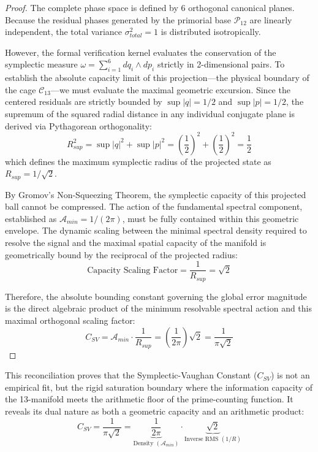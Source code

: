 \documentclass[sn-mathphys-num, pdflatex]{sn-jnl}
\begin{document}
\begin{proof}
The complete phase space is defined by 6 orthogonal canonical planes. Because the residual phases generated by the primorial base $\mathcal{P}_{12}$ are linearly independent, the total variance $\sigma_{total}^2 = 1$ is distributed isotropically. 

However, the formal verification kernel evaluates the conservation of the symplectic measure $\omega = \sum_{i=1}^{6} dq_i \wedge dp_i$ strictly in 2-dimensional pairs. To establish the absolute capacity limit of this projection—the physical boundary of the cage $\mathcal{C}_{13}$—we must evaluate the maximal geometric excursion. Since the centered residuals are strictly bounded by $\sup|q| = 1/2$ and $\sup|p| = 1/2$, the supremum of the squared radial distance in any individual conjugate plane is derived via Pythagorean orthogonality:
$$ R_{sup}^2 = \sup|q|^2 + \sup|p|^2 = \left(\frac{1}{2}\right)^2 + \left(\frac{1}{2}\right)^2 = \frac{1}{2} $$
which defines the maximum symplectic radius of the projected state as $R_{sup} = 1/\sqrt{2}$.

By Gromov's Non-Squeezing Theorem, the symplectic capacity of this projected ball cannot be compressed. The action of the fundamental spectral component, established as $\mathcal{A}_{min} = 1/(2\pi)$, must be fully contained within this geometric envelope. The dynamic scaling between the minimal spectral density required to resolve the signal and the maximal spatial capacity of the manifold is geometrically bound by the reciprocal of the projected radius:
$$ \text{Capacity Scaling Factor} = \frac{1}{R_{sup}} = \sqrt{2} $$

Therefore, the absolute bounding constant governing the global error magnitude is the direct algebraic product of the minimum resolvable spectral action and this maximal orthogonal scaling factor:
$$ C_{SV} = \mathcal{A}_{min} \cdot \frac{1}{R_{sup}} = \left(\frac{1}{2\pi}\right) \sqrt{2} = \frac{1}{\pi\sqrt{2}} $$
\end{proof}

This reconciliation proves that the Symplectic-Vaughan Constant ($C_{SV}$) is not an empirical fit, but the rigid saturation boundary where the information capacity of the 13-manifold meets the arithmetic floor of the prime-counting function. It reveals its dual nature as both a geometric capacity and an arithmetic product:
\begin{equation}
C_{SV} = \frac{1}{\pi\sqrt{2}} = \underbrace{\frac{1}{2\pi}}_{\text{Density } (\mathcal{A}_{min})} \cdot \underbrace{\sqrt{2}}_{\text{Inverse RMS } (1/R)}
\label{CSV}
\end{equation}
\end{document}
